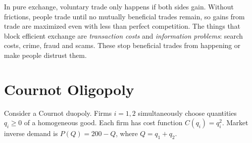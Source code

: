 \begin{description}
\begin{solution}
In pure exchange, voluntary trade only happens if both sides gain. Without frictions, people trade until no mutually beneficial trades remain, so gains from trade are maximized even with less than perfect competition. The things that block efficient exchange are \emph{transaction costs} and \emph{information problems}: search costs, crime, fraud and scams. These stop beneficial trades from happening or make people distrust them.
\end{solution}
\end{description}

\section{Cournot Oligopoly}

\noindent Consider a Cournot duopoly. Firms $i=1,2$ simultaneously choose quantities $q_i\ge0$ of a homogeneous good. Each firm has cost function $C(q_i)=q_i^2$. Market inverse demand is $P(Q)=200-Q$, where $Q=q_1+q_2$.

